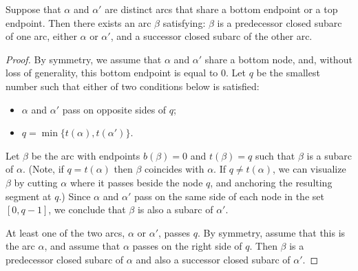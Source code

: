 \documentclass[ALCO,ThmDefs,Unicode,epreuves]{cedram}
\renewcommand{\1}{\hat{1}}
\newcommand{\0}{\hat{0}}
\begin{document}
\begin{lemma}\label{special subarc shared endpoint}
Suppose that $\alpha$ and $\alpha'$ are distinct arcs that share a bottom endpoint or a top endpoint.
Then there exists an arc $\beta$ satisfying:
$\beta$ is a predecessor closed subarc of one arc, either $\alpha$ or $\alpha'$, and a successor closed subarc of the other arc.
\end{lemma}
\begin{proof}
By symmetry, we assume that $\alpha$ and $\alpha'$ share a bottom node, and, without loss of generality, this bottom endpoint is equal to 0.
Let $q$ be the smallest number such that either of two conditions below is satisfied:
\begin{itemize}
\item $\alpha$ and $\alpha'$ pass on opposite sides of $q$;
\item $q= \min\{t(\alpha), t(\alpha')\}$.
\end{itemize}

Let $\beta$ be the arc with endpoints $b(\beta)=0$ and $t(\beta)=q$ such that $\beta$ is a subarc of $\alpha$.
(Note, if $q= t(\alpha)$ then $\beta$ coincides with $\alpha$.
If $q\ne t(\alpha)$, we can visualize $\beta$ by cutting $\alpha$ where it passes beside the node $q$, and anchoring the resulting segment at $q$.)
Since $\alpha$ and $\alpha'$ pass on the same side of each node in the
set $[0,q-1]$, we conclude that $\beta$ is also a subarc of $\alpha'$.


At least one of the two arcs, $\alpha$ or $\alpha'$, passes $q$.
By symmetry, assume that this is the arc $\alpha$, and assume that $\alpha$ passes on the right side of $q$.
Then $\beta$ is a predecessor closed subarc of $\alpha$ and also a
successor closed subarc of $\alpha'$.
\end{proof}
\end{document}
